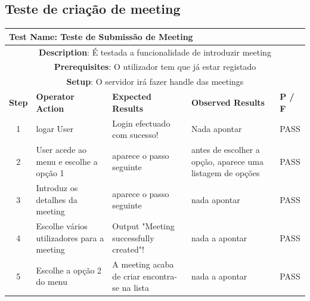 \documentclass[12pt]{article} %
\begin{document}
\subsection{Teste de criação de meeting}
\begin{table}[ht!]
	\begin{tabular}{|c|p{4cm}|p{4cm}|p{3cm}|p{1cm}|}
		\hline
		\multicolumn{5}{|l|}{\textbf{Test Name}: Teste de Submissão de Meeting}\\
		\hline
		\multicolumn{5}{|p{14,5cm}|}{\textbf{Description}: É testada a funcionalidade de introduzir meeting}\\
		\hline
		\multicolumn{5}{|p{14,5cm}|}{\textbf{Prerequisites}: O utilizador tem que já estar registado}\\
		\hline
		\multicolumn{5}{|p{14,5cm}|}{\textbf{Setup}: O servidor irá fazer handle das meetings}\\
		\hline
		\textbf{Step} & \textbf{Operator Action} & \textbf{Expected Results} & \textbf{Observed Results} & \textbf{P / F}\\
		\hline
		1 & logar User & Login efectuado com sucesso! & Nada apontar & PASS\\
		\hline
		2 & User acede ao menu e escolhe a opção 1 & aparece o passo seguinte & antes de escolher a opção, aparece uma listagem de opções & PASS\\
		\hline
		3 & Introduz os detalhes da meeting & aparece o passo seguinte & nada apontar & PASS\\
		\hline
		4 & Escolhe vários utilizadores para a meeting & Output "Meeting successfully created"! & nada a apontar & PASS\\
		\hline
		5 & Escolhe a opção 2 do menu & A meeting acaba de criar encontra-se na lista & nada a apontar & PASS\\
		\hline
		
	\end{tabular}
\end{table}
\pagebreak



\end{document}
